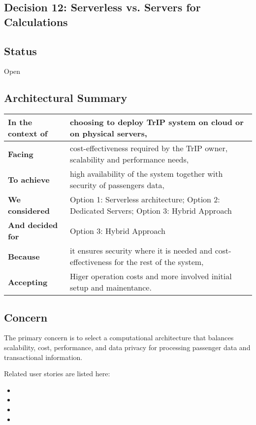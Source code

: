 \subsection{Decision 12: Serverless vs. Servers for Calculations}

\subsection*{Status}
Open

\subsection*{Architectural Summary}
\begin{tabular}{|p{3.5cm}|p{10.5cm}|}
    \hline
    \textbf{In the context of} & choosing to deploy TrIP system on cloud or on physical servers, \\
    \hline
    \textbf{Facing} & cost-effectiveness required by the TrIP owner, scalability and performance needs, \\
    \hline
    \textbf{To achieve} & high availability of the system together with security of passengers data, \\
    \hline
    \textbf{We considered} & Option 1: Serverless architecture; Option 2: Dedicated Servers; Option 3: Hybrid Approach\\
    \hline
    \textbf{And decided for} & Option 3: Hybrid Approach \\
    \hline
    \textbf{Because} & it ensures security where it is needed and cost-effectiveness for the rest of the system, \\
    \hline
    \textbf{Accepting} & Higer operation costs and more involved initial setup and mainentance. \\
    \hline
\end{tabular}

\subsection*{Concern}
The primary concern is to select a computational architecture that balances scalability, cost, performance, and data privacy for processing passenger data and transactional information.

Related user stories are listed here:
\begin{itemize}[noitemsep]
    \item \userStoryTwentyNine
    \item \userStoryThirty
    \item \userStoryThirtyOne
    \item \userStoryEighteen
\end{itemize}

